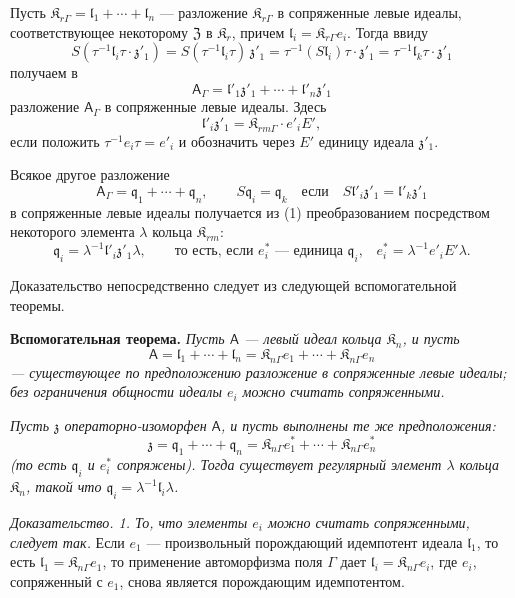 \documentclass[11pt]{article}
\begin{document}
Пусть \(\mathfrak K_{r\Gamma}=\mathfrak l_1+\cdots+\mathfrak l_n\) --- разложение \(\mathfrak K_{r\Gamma}\) в сопряженные левые идеалы, соответствующее некоторому \(\mathfrak Z\) в \(\mathfrak K_r\), причем \(\mathfrak l_i=\mathfrak K_{r\Gamma}e_i\). Тогда ввиду
\[
S(\tau^{-1}\mathfrak l_i\tau\cdot\mathfrak z'_1)
=S(\tau^{-1}\mathfrak l_i\tau)\,\mathfrak z'_1
=\tau^{-1}(S\mathfrak l_i)\tau\cdot\mathfrak z'_1
=\tau^{-1}\mathfrak l_k\tau\cdot\mathfrak z'_1
\]
получаем в
\[
\tag{1}
\mathsf{A}_\Gamma=\mathfrak l'_1\mathfrak z'_1+\cdots+\mathfrak l'_n\mathfrak z'_1
\]
разложение \(\mathsf{A}_\Gamma\) в сопряженные левые идеалы. Здесь
\[
\mathfrak l'_i\mathfrak z'_1=\mathfrak K_{rm\Gamma}\cdot e'_iE',
\]
если положить \(\tau^{-1}e_i\tau=e'_i\) и обозначить через \(E'\) единицу идеала \(\mathfrak z'_1\).

Всякое другое разложение
\[
\tag{2}
\mathsf{A}_\Gamma=\mathfrak q_1+\cdots+\mathfrak q_n,\qquad
S\mathfrak q_i=\mathfrak q_k\quad\text{если}\quad
S\mathfrak l'_i\mathfrak z'_1=\mathfrak l'_k\mathfrak z'_1
\]
в сопряженные левые идеалы получается из (1) преобразованием посредством некоторого элемента \(\lambda\) кольца \(\mathfrak K_{rm}\):
\[
\mathfrak q_i=\lambda^{-1}\mathfrak l'_i\mathfrak z'_1\lambda,
\qquad
\text{то есть, если \(e_i^*\) --- единица \(\mathfrak q_i\),}\quad
e_i^*=\lambda^{-1}e'_iE'\lambda.
\]

Доказательство непосредственно следует из следующей вспомогательной теоремы.

\textbf{Вспомогательная теорема.} \emph{Пусть \(\mathsf{A}\) --- левый идеал кольца \(\mathfrak K_n\), и пусть}
\[
\mathsf{A}=\mathfrak l_1+\cdots+\mathfrak l_n
=\mathfrak K_{n\Gamma}e_1+\cdots+\mathfrak K_{n\Gamma}e_n
\]
\emph{--- существующее по предположению разложение в сопряженные левые идеалы; без ограничения общности идеалы \(e_i\) можно считать сопряженными.}

\emph{Пусть \(\mathfrak z\) операторно-изоморфен \(\mathsf{A}\), и пусть выполнены те же предположения:}
\[
\mathfrak z=\mathfrak q_1+\cdots+\mathfrak q_n
=\mathfrak K_{n\Gamma}e_1^*+\cdots+\mathfrak K_{n\Gamma}e_n^*
\]
\emph{(то есть \(\mathfrak q_i\) и \(e_i^*\) сопряжены). Тогда существует регулярный элемент \(\lambda\) кольца \(\mathfrak K_n\), такой что \(\mathfrak q_i=\lambda^{-1}\mathfrak l_i\lambda\).}

\emph{Доказательство. 1. То, что элементы \(e_i\) можно считать сопряженными, следует так.} Если \(e_1\) --- произвольный порождающий идемпотент идеала \(\mathfrak l_1\), то есть \(\mathfrak l_1=\mathfrak K_{n\Gamma}e_1\), то применение автоморфизма поля \(\Gamma\) дает \(\mathfrak l_i=\mathfrak K_{n\Gamma}e_i\), где \(e_i\), сопряженный с \(e_1\), снова является порождающим идемпотентом.
\end{document}
